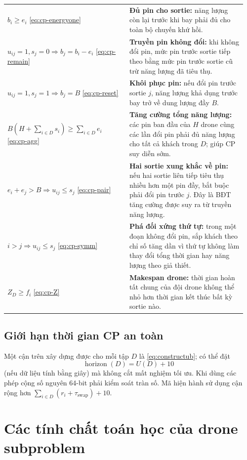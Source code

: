 \documentclass[11pt,a4paper]{article}
\theoremstyle{definition}
\theoremstyle{plain}
\theoremstyle{remark}
\newcommand{\sw}{\tau_{\mathrm{swap}}}
\begin{document}
\begin{longtable}{@{}p{0.49\linewidth}p{0.47\linewidth}@{}}
$\displaystyle b_i\ge e_i$ \eqref{eq:cp-energyone}
& \textbf{Đủ pin cho sortie:} năng lượng còn lại trước khi bay phải đủ cho toàn bộ chuyến khứ hồi.\\
$u_{ij}=1,s_j=0\Rightarrow b_j=b_i-e_i$ \eqref{eq:cp-remain}
& \textbf{Truyền pin không đổi:} khi không đổi pin, mức pin trước sortie tiếp theo bằng mức pin trước sortie cũ trừ năng lượng đã tiêu thụ.\\
$u_{ij}=1,s_j=1\Rightarrow b_j=B$ \eqref{eq:cp-reset}
& \textbf{Khôi phục pin:} nếu đổi pin trước sortie $j$, năng lượng khả dụng trước bay trở về dung lượng đầy $B$.\\
$\displaystyle B\left(H+\sum_{i\in D}s_i\right)\ge\sum_{i\in D}e_i$ \eqref{eq:cp-agg}
& \textbf{Tăng cường tổng năng lượng:} các pin ban đầu của $H$ drone cùng các lần đổi pin phải đủ năng lượng cho tất cả khách trong $D$; giúp CP suy diễn sớm.\\
$e_i+e_j>B\Rightarrow u_{ij}\le s_j$ \eqref{eq:cp-pair}
& \textbf{Hai sortie xung khắc về pin:} nếu hai sortie liên tiếp tiêu thụ nhiều hơn một pin đầy, bắt buộc phải đổi pin trước $j$. Đây là BĐT tăng cường được suy ra từ truyền năng lượng.\\
$i>j\Rightarrow u_{ij}\le s_j$ \eqref{eq:cp-symm}
& \textbf{Phá đối xứng thứ tự:} trong một đoạn không đổi pin, sắp khách theo chỉ số tăng dần vì thứ tự không làm thay đổi tổng thời gian hay năng lượng theo giả thiết.\\
$\displaystyle Z_D\ge f_i$ \eqref{eq:cp-Z}
& \textbf{Makespan drone:} thời gian hoàn tất chung của đội drone không thể nhỏ hơn thời gian kết thúc bất kỳ sortie nào.\\
\end{longtable}
\endgroup

\subsection{Giới hạn thời gian CP an toàn}
Một cận trên xây dựng được cho mỗi tập $D$ là \eqref{eq:constructub}; có thể đặt
\begin{equation}\label{eq:horizon}
\operatorname{horizon}(D)=U(D)+10
\end{equation}
(nếu dữ liệu tính bằng giây) mà không cắt mất nghiệm tối ưu. Khi dùng các phép cộng số nguyên 64-bit phải kiểm soát tràn số. Mã hiện hành sử dụng cận rộng hơn $\sum_{i\in D}(r_i+\sw)+10$.

\section{Các tính chất toán học của drone subproblem}
\end{document}
